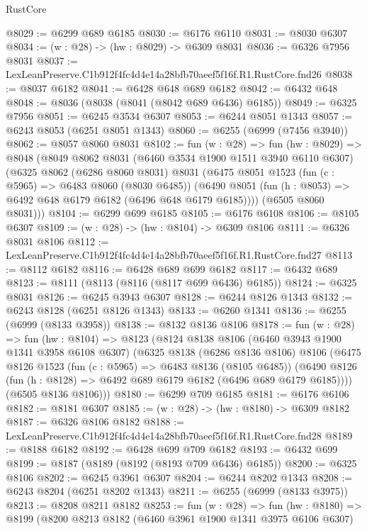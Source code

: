 \begin{lexlean}{RustCore}
\begin{coremodule}
@8029 := @6299 @689 @6185
@8030 := @6176 @6110
@8031 := @8030 @6307
@8034 := (w : @28) -> (hw : @8029) -> @6309 @8031
@8036 := @6326 @7956 @8031
@8037 := LexLeanPreserve.C1b912f4fc4d4e14a28bfb70aeef5f16f.R1.RustCore.fnd26
@8038 := @8037 @6182
@8041 := @6428 @648 @689 @6182
@8042 := @6432 @648
@8048 := @8036 (@8038 (@8041 (@8042 @689 @6436) @6185))
@8049 := @6325 @7956
@8051 := @6245 @3534 @6307
@8053 := @6244 @8051 @1343
@8057 := @6243 @8053 (@6251 @8051 @1343)
@8060 := @6255 (@6999 (@7456 @3940))
@8062 := @8057 @8060 @8031
@8102 := fun (w : @28) =>
  fun (hw : @8029) =>
  @8048
    (@8049
      @8062
      @8031
      (@6460 @3534 @1900 @1511 @3940 @6110 @6307)
      (@6325
        @8062
        (@6286 @8060 @8031)
        @8031
        (@6475
          @8051
          @1523
          (fun (c : @5965) => @6483 @8060 (@8030 @6485))
          (@6490 @8051 (fun (h : @8053) => @6492 @648 @6179 @6182 (@6496 @648 @6179 @6185))))
        (@6505 @8060 @8031)))
@8104 := @6299 @699 @6185
@8105 := @6176 @6108
@8106 := @8105 @6307
@8109 := (w : @28) -> (hw : @8104) -> @6309 @8106
@8111 := @6326 @8031 @8106
@8112 := LexLeanPreserve.C1b912f4fc4d4e14a28bfb70aeef5f16f.R1.RustCore.fnd27
@8113 := @8112 @6182
@8116 := @6428 @689 @699 @6182
@8117 := @6432 @689
@8123 := @8111 (@8113 (@8116 (@8117 @699 @6436) @6185))
@8124 := @6325 @8031
@8126 := @6245 @3943 @6307
@8128 := @6244 @8126 @1343
@8132 := @6243 @8128 (@6251 @8126 @1343)
@8133 := @6260 @1341
@8136 := @6255 (@6999 (@8133 @3958))
@8138 := @8132 @8136 @8106
@8178 := fun (w : @28) =>
  fun (hw : @8104) =>
  @8123
    (@8124
      @8138
      @8106
      (@6460 @3943 @1900 @1341 @3958 @6108 @6307)
      (@6325
        @8138
        (@6286 @8136 @8106)
        @8106
        (@6475
          @8126
          @1523
          (fun (c : @5965) => @6483 @8136 (@8105 @6485))
          (@6490 @8126 (fun (h : @8128) => @6492 @689 @6179 @6182 (@6496 @689 @6179 @6185))))
        (@6505 @8136 @8106)))
@8180 := @6299 @709 @6185
@8181 := @6176 @6106
@8182 := @8181 @6307
@8185 := (w : @28) -> (hw : @8180) -> @6309 @8182
@8187 := @6326 @8106 @8182
@8188 := LexLeanPreserve.C1b912f4fc4d4e14a28bfb70aeef5f16f.R1.RustCore.fnd28
@8189 := @8188 @6182
@8192 := @6428 @699 @709 @6182
@8193 := @6432 @699
@8199 := @8187 (@8189 (@8192 (@8193 @709 @6436) @6185))
@8200 := @6325 @8106
@8202 := @6245 @3961 @6307
@8204 := @6244 @8202 @1343
@8208 := @6243 @8204 (@6251 @8202 @1343)
@8211 := @6255 (@6999 (@8133 @3975))
@8213 := @8208 @8211 @8182
@8253 := fun (w : @28) =>
  fun (hw : @8180) =>
  @8199
    (@8200
      @8213
      @8182
      (@6460 @3961 @1900 @1341 @3975 @6106 @6307)

\end{coremodule}
\end{lexlean}
